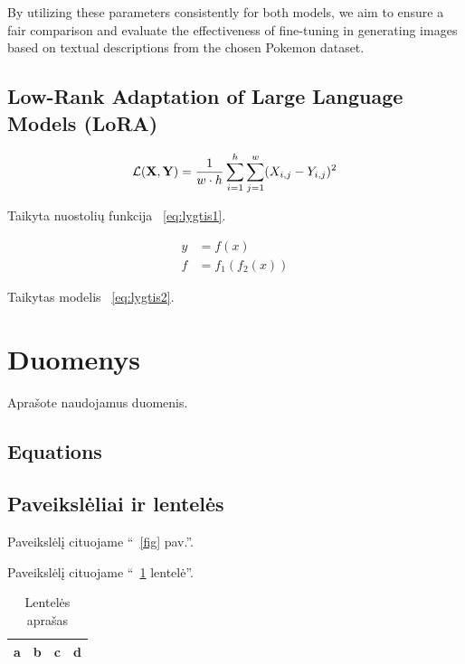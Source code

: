 \documentclass[conference]{IEEEtran}
\begin{document}
By utilizing these parameters consistently for both models, we aim to ensure a fair comparison and evaluate the effectiveness of fine-tuning in generating images based on textual descriptions from the chosen Pokemon dataset.

\subsection{Low-Rank Adaptation of Large Language Models (LoRA)}

\begin{equation}
\mathcal{L}({\bf X}, {\bf Y}) = \frac{1}{w \cdot h} \sum_{i=1}^h \sum_{j=1}^w (X_{i, j} - Y_{i, j})^2
\label{eq:lygtis1}
\end{equation}

Taikyta nuostolių funkcija ~\eqref{eq:lygtis1}.

\begin{align}
y & = f(x) \nonumber \\
f & = f_1(f_2(x))
\label{eq:lygtis2}
\end{align}

Taikytas modelis ~\eqref{eq:lygtis2}.


\section{Duomenys}
Aprašote naudojamus duomenis.

\subsection{Equations}



\subsection{Paveikslėliai ir lentelės}

Paveikslėlį cituojame ``~\ref{fig} pav.''.

Paveikslėlį cituojame ``~\ref{tab1} lentelė''.

\begin{table}[htbp]
\caption{Lentelės aprašas}
\begin{center}
\begin{tabular}{|c|c|c|c|}
\hline
a & b & c &  d \\
\hline
\end{tabular}
\label{tab1}
\end{center}
\end{table}
\end{document}
